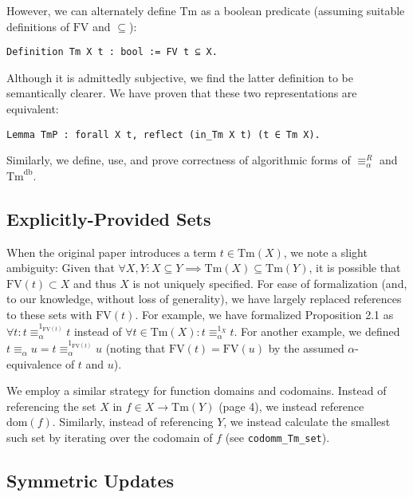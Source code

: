 \documentclass{article}
\begin{document}
However, we can alternately define $\textrm{Tm}$ as a boolean predicate (assuming suitable
definitions of $\textrm{FV}$ and $\subseteq$):

\begin{verbatim}
Definition Tm X t : bool := FV t ⊆ X.
\end{verbatim}

Although it is admittedly subjective, we find the latter definition to be semantically clearer. We
have proven that these two representations are equivalent:

\begin{verbatim}
Lemma TmP : forall X t, reflect (in_Tm X t) (t ∈ Tm X).
\end{verbatim}

Similarly, we define, use, and prove correctness of algorithmic forms of $\equiv_\alpha^R$ and
$\textrm{Tm}^{\textrm{db}}$.

\subsection{Explicitly-Provided Sets}

When the original paper introduces a term $t \in \textrm{Tm}(X)$, we note a slight ambiguity: Given
that $\forall X, Y : X \subseteq Y \implies \textrm{Tm}(X) \subseteq \textrm{Tm}(Y)$, it is possible
that $\textrm{FV}(t) \subset X$ and thus $X$ is not uniquely specified. For ease of formalization
(and, to our knowledge, without loss of generality), we have largely replaced references to these
sets with $\textrm{FV}(t)$. For example, we have formalized Proposition 2.1 as $\forall t : t
\equiv_\alpha^{1_{\textrm{FV}(t)}} t$ instead of $\forall t \in \textrm{Tm}(X) : t
\equiv_\alpha^{1_X} t$. For another example, we defined $t \equiv_\alpha u = t
\equiv_\alpha^{1_{\textrm{FV}(t)}} u$ (noting that $\textrm{FV}(t) = \textrm{FV}(u)$ by the assumed
$\alpha$-equivalence of $t$ and $u$).

We employ a similar strategy for function domains and codomains. Instead of referencing the set $X$
in $f \in X \longrightarrow \textrm{Tm}(Y)$ (page 4), we instead reference $\textrm{dom}(f)$.
Similarly, instead of referencing $Y$, we instead calculate the smallest such set by iterating over
the codomain of $f$ (see \verb|codomm_Tm_set|).

\subsection{Symmetric Updates}
\end{document}
